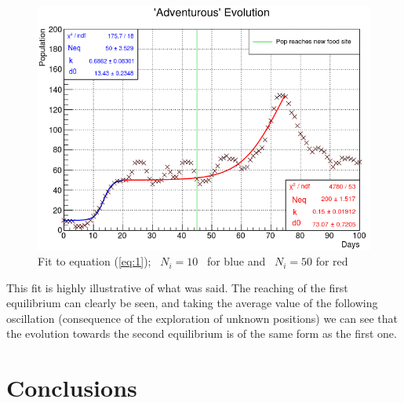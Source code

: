 \documentclass[a4paper,prd,twocolumn,nofootinbib,superscriptaddress,floatfix]{revtex4}
\begin{document}
 \begin{figure}[H]
\centering
  \includegraphics[scale=0.35]{adventurous.png}
\caption{Fit to equation  (\ref{eq:1}); \ $N_i=10$ \ for blue and   \ $N_i=50$ for red }
  \label{fig:8}
\end{figure}

This fit is highly illustrative of what was said. The reaching of the first equilibrium can clearly be seen, and taking the average value of the following oscillation (consequence of the exploration of unknown positions) we can see that the evolution towards the second equilibrium is of the same form as the first one.

\section{Conclusions}
\end{document}
